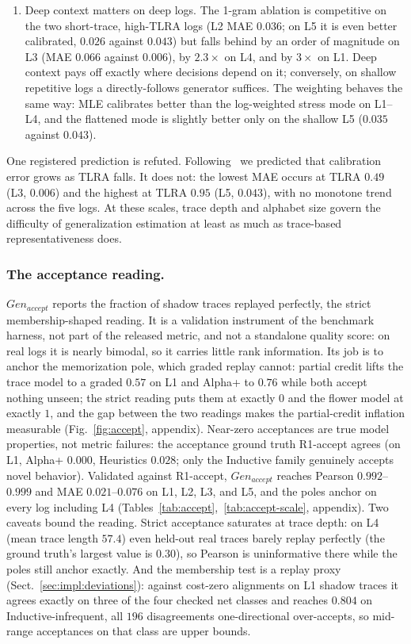 \documentclass[runningheads]{llncs}
\newcommand{\genaccept}{\ensuremath{\mathit{Gen}_{\mathit{accept}}}}
\begin{document}
\begin{enumerate}
  \item Deep context matters on deep logs. The 1-gram ablation is competitive on the two short-trace, high-TLRA logs (L2 MAE $0.036$; on L5 it is even better calibrated, $0.026$ against $0.043$) but falls behind by an order of magnitude on L3 (MAE $0.066$ against $0.006$), by $2.3\times$ on L4, and by $3\times$ on L1. Deep context pays off exactly where decisions depend on it; conversely, on shallow repetitive logs a directly-follows generator suffices. The weighting behaves the same way: MLE calibrates better than the log-weighted stress mode on L1--L4, and the flattened mode is slightly better only on the shallow L5 ($0.035$ against $0.043$).\end{enumerate}

One registered prediction is refuted. Following~\cite{karunaratne2024representativeness} we predicted that calibration error grows as TLRA falls. It does not: the lowest MAE occurs at TLRA $0.49$ (L3, $0.006$) and the highest at TLRA $0.95$ (L5, $0.043$), with no monotone trend across the five logs. At these scales, trace depth and alphabet size govern the difficulty of generalization estimation at least as much as trace-based representativeness does.

\subsubsection{The acceptance reading.}
\label{sec:eval:accept}
\genaccept{} reports the fraction of shadow traces replayed perfectly, the strict membership-shaped reading. It is a validation instrument of the benchmark harness, not part of the released metric, and not a standalone quality score: on real logs it is nearly bimodal, so it carries little rank information. Its job is to anchor the memorization pole, which graded replay cannot: partial credit lifts the trace model to a graded $0.57$ on L1 and Alpha+ to $0.76$ while both accept nothing unseen; the strict reading puts them at exactly $0$ and the flower model at exactly $1$, and the gap between the two readings makes the partial-credit inflation measurable (Fig.~\ref{fig:accept}, appendix). Near-zero acceptances are true model properties, not metric failures: the acceptance ground truth R1-accept agrees (on L1, Alpha+ $0.000$, Heuristics $0.028$; only the Inductive family genuinely accepts novel behavior). Validated against R1-accept, \genaccept{} reaches Pearson $0.992$--$0.999$ and MAE $0.021$--$0.076$ on L1, L2, L3, and L5, and the poles anchor on every log including L4 (Tables~\ref{tab:accept},~\ref{tab:accept-scale}, appendix). Two caveats bound the reading. Strict acceptance saturates at trace depth: on L4 (mean trace length $57.4$) even held-out real traces barely replay perfectly (the ground truth's largest value is $0.30$), so Pearson is uninformative there while the poles still anchor exactly. And the membership test is a replay proxy (Sect.~\ref{sec:impl:deviations}): against cost-zero alignments on L1 shadow traces it agrees exactly on three of the four checked net classes and reaches $0.804$ on Inductive-infrequent, all $196$ disagreements one-directional over-accepts, so mid-range acceptances on that class are upper bounds.
\end{document}
